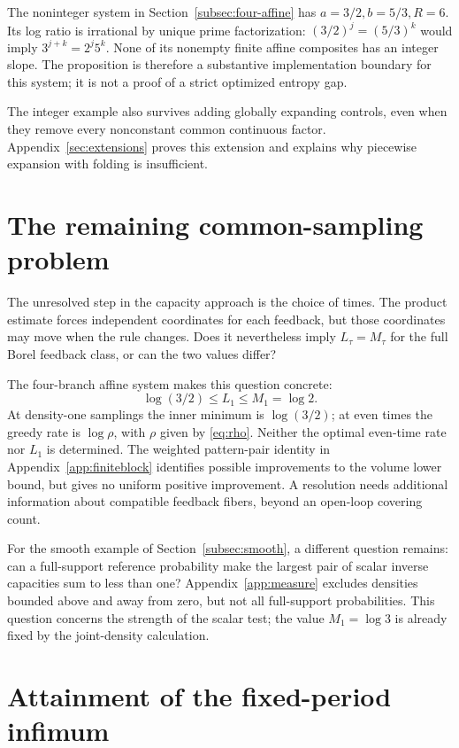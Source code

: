\documentclass[11pt,reqno]{amsart}
\numberwithin{equation}{section}
\theoremstyle{definition}
\theoremstyle{definition}
\begin{document}
The noninteger system in Section~\ref{subsec:four-affine} has
$a=3/2,b=5/3,R=6$. Its log ratio is irrational by unique prime
factorization: $(3/2)^j=(5/3)^k$ would imply
$3^{j+k}=2^j5^k$. None of its nonempty finite affine composites
has an integer slope. The proposition is therefore a substantive
implementation boundary for this system; it is not a proof of a
strict optimized entropy gap.

The integer example also survives adding globally expanding controls,
even when they remove every nonconstant common continuous factor.
Appendix~\ref{sec:extensions} proves this extension and explains why
piecewise expansion with folding is insufficient.

\section{The remaining common-sampling problem}\label{app:scope}
The unresolved step in the capacity approach is the choice of times.
The product estimate forces independent coordinates for each
feedback, but those coordinates may move when the rule changes.
Does it nevertheless imply $L_\tau=M_\tau$ for the full Borel
feedback class, or can the two values differ?

The four-branch affine system makes this question concrete:
\[
 \log(3/2)\le L_1\le M_1=\log2.
\]
At density-one samplings the inner minimum is $\log(3/2)$; at even
times the greedy rate is $\log\rho$, with $\rho$ given by
\eqref{eq:rho}. Neither the optimal even-time rate nor $L_1$ is
determined. The weighted pattern-pair identity in
Appendix~\ref{app:finiteblock} identifies possible improvements to
the volume lower bound, but gives no uniform positive improvement.
A resolution needs additional information about compatible feedback
fibers, beyond an open-loop covering count.

For the smooth example of Section~\ref{subsec:smooth}, a different
question remains: can a full-support reference probability make the
largest pair of scalar inverse capacities sum to less than one?
Appendix~\ref{app:measure} excludes densities bounded above and away
from zero, but not all full-support probabilities. This question
concerns the strength of the scalar test; the value $M_1=\log3$
is already fixed by the joint-density calculation.

\appendix

\section{Attainment of the fixed-period infimum}\label{app:minimum}
\end{document}
